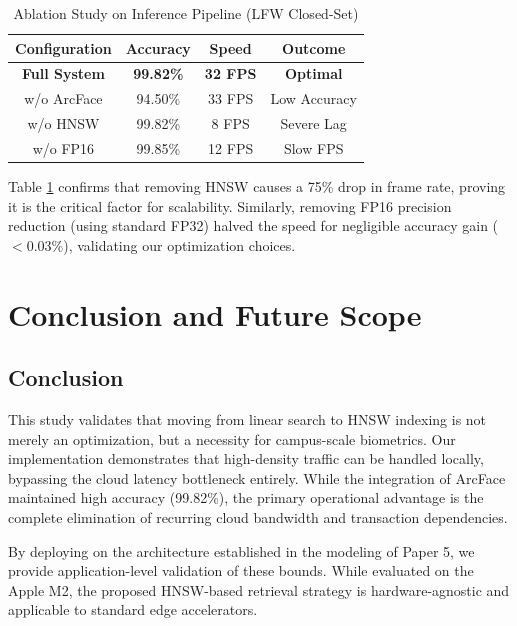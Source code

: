 \documentclass[conference]{IEEEtran}
\begin{document}
\begin{table}[htbp]
\caption{Ablation Study on Inference Pipeline (LFW Closed-Set)}
\begin{center}
\begin{tabular}{|c|c|c|c|}
\hline
\textbf{Configuration} & \textbf{Accuracy} & \textbf{Speed} & \textbf{Outcome} \\
\hline
\textbf{Full System} & \textbf{99.82\%} & \textbf{32 FPS} & \textbf{Optimal} \\
\hline
w/o ArcFace & 94.50\% & 33 FPS & Low Accuracy \\
\hline
w/o HNSW & 99.82\% & 8 FPS & Severe Lag \\
\hline
w/o FP16 & 99.85\% & 12 FPS & Slow FPS \\
\hline
\end{tabular}
\label{tab_ablation}
\end{center}
\end{table}

Table \ref{tab_ablation} confirms that removing HNSW causes a 75\% drop in frame rate, proving it is the critical factor for scalability. Similarly, removing FP16 precision reduction (using standard FP32) halved the speed for negligible accuracy gain ($<0.03\%$), validating our optimization choices.

\section{Conclusion and Future Scope}

\subsection{Conclusion}
This study validates that moving from linear search to HNSW indexing is not merely an optimization, but a necessity for campus-scale biometrics. Our implementation demonstrates that high-density traffic can be handled locally, bypassing the cloud latency bottleneck entirely. While the integration of ArcFace maintained high accuracy (99.82\%), the primary operational advantage is the complete elimination of recurring cloud bandwidth and transaction dependencies. 

By deploying on the architecture established in the modeling of Paper 5, we provide application-level validation of these bounds. While evaluated on the Apple M2, the proposed HNSW-based retrieval strategy is hardware-agnostic and applicable to standard edge accelerators.
\end{document}
